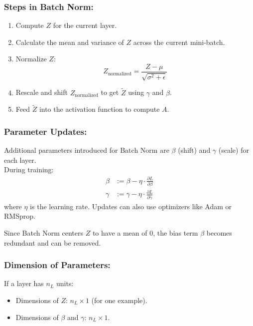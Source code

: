\documentclass[letterpaper,12pt,notitlepage,twoside]{report}
\begin{document}
\subsubsection{Steps in Batch Norm:}
\begin{enumerate}[noitemsep, topsep=0pt]
    \item Compute \( Z \) for the current layer.
    \item Calculate the mean and variance of \( Z \) across the current mini-batch.
    \item Normalize \( Z \):
    \[
    Z_{\text{normalized}} = \frac{Z - \mu}{\sqrt{\sigma^2 + \epsilon}}
    \]
    \item Rescale and shift \( Z_{\text{normalized}} \) to get \( \tilde{Z} \) using \( \gamma \) and \( \beta \).
    \item Feed \( \tilde{Z} \) into the activation function to compute \( A \).
\end{enumerate}

\subsubsection{Parameter Updates:}
Additional parameters introduced for Batch Norm are \( \beta \) (shift) and \( \gamma \) (scale) for each layer. \\
During training:
\begin{align*}
    \beta &:= \beta - \eta \cdot \frac{\partial L}{\partial \beta} \\
    \gamma &:= \gamma - \eta \cdot \frac{\partial L}{\partial \gamma}
\end{align*}
where \( \eta \) is the learning rate. Updates can also use optimizers like Adam or RMSprop.

Since Batch Norm centers \( Z \) to have a mean of 0, the bias term \( \beta \) becomes redundant and can be removed.

\subsubsection{Dimension of Parameters:}
If a layer has \( n_L \) units:
\begin{itemize}[noitemsep, topsep=0pt]
    \item Dimensions of \( Z \): \( n_L \times 1 \) (for one example).
    \item Dimensions of \( \beta \) and \( \gamma \): \( n_L \times 1 \).
\end{itemize}

\end{document}
